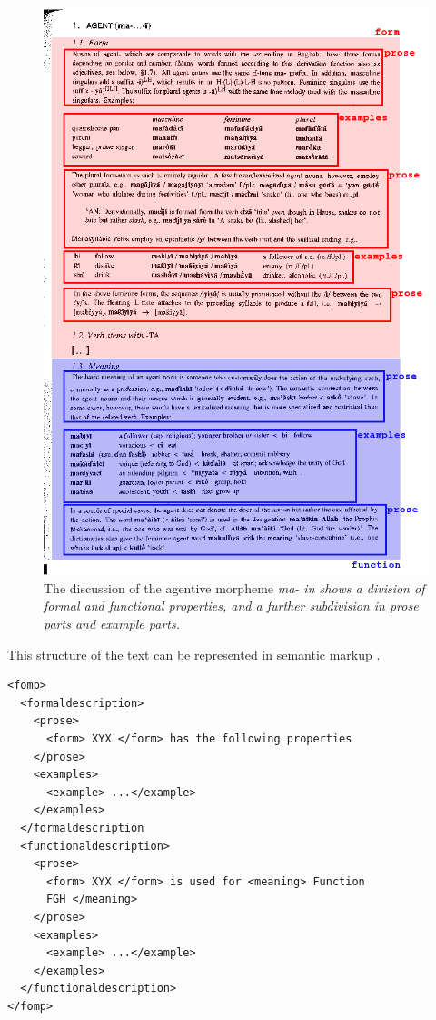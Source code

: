 \documentclass[a4paper,12pt]{article}
\begin{document}
\begin{figure}
\includegraphics[height=\textheight]{hausa-agentma}
\caption{The discussion of the agentive morpheme \em ma- \em in \citet{Newman2000} shows a division of formal and functional properties, and a further subdivision in prose parts and example parts.}
\label{fig:hausa:ma}
\end{figure}

This structure of the text can be represented in semantic markup .

\ea\label{xml:fofomp:functionalformal}
\begin{verbatim}
<fomp>
  <formaldescription>
    <prose>
      <form> XYX </form> has the following properties
    </prose>
    <examples>
      <example> ...</example>
    </examples>
  </formaldescription
  <functionaldescription>
    <prose>
      <form> XYX </form> is used for <meaning> Function
      FGH </meaning>
    </prose>
    <examples>
      <example> ...</example>
    </examples>
  </functionaldescription>
</fomp>
\end{verbatim}
\z
\end{document}
